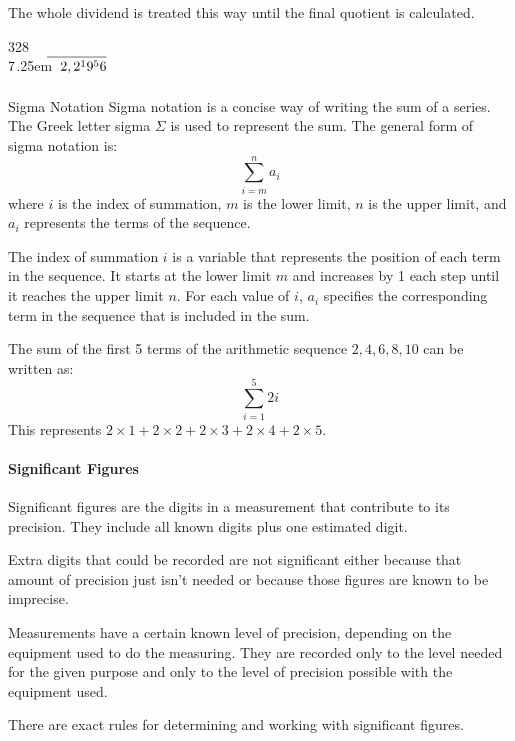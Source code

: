 \documentclass[12pt]{article}
\newcommand\mylongdiv[2]{%
$\strut#1$\kern.25em\smash{\raise.3ex\hbox{$\big)$}}$\mkern-8mu\overline{\quad\strut#2}$}
\begin{document}
The whole dividend is treated this way until the final quotient is calculated.
\begin{center}
\hspace{5.8ex}3\hspace{0.8ex}2\hspace{0.8ex}8\\
\mylongdiv{7}{2,2{^1}9{^5}6}\\
\end{center}

\paragraph{}{Sigma Notation}
Sigma notation is a concise way of writing the sum of a series. The Greek letter sigma \(\Sigma\) is used to represent the sum. The general form of sigma notation is:
\[
\sum_{i=m}^{n} a_i
\]
where \(i\) is the index of summation, \(m\) is the lower limit, \(n\) is the upper limit, and \(a_i\) represents the terms of the sequence. 

The index of summation \(i\) is a variable that represents the position of each term in the sequence. It starts at the lower limit \(m\) and increases by 1 each step until it reaches the upper limit \(n\). For each value of \(i\), \(a_i\) specifies the corresponding term in the sequence that is included in the sum.

The sum of the first 5 terms of the arithmetic sequence \(2, 4, 6, 8, 10\) can be written as:
\[
\sum_{i=1}^{5} 2i
\]
This represents \(2 \times 1 + 2 \times 2 + 2 \times 3 + 2 \times 4 + 2 \times 5\).

\paragraph{Significant Figures}

Significant figures are the digits in a measurement that contribute to its precision. They include all known digits plus one estimated digit.

Extra digits that could be recorded are not significant either because that amount of precision just isn't needed or because those figures are known to be imprecise.

Measurements have a certain known level of precision, depending on the equipment used to do the measuring. They are recorded only to the level needed for the given purpose and only to the level of precision possible with the equipment used.

There are exact rules for determining and working with significant figures.
\end{document}
